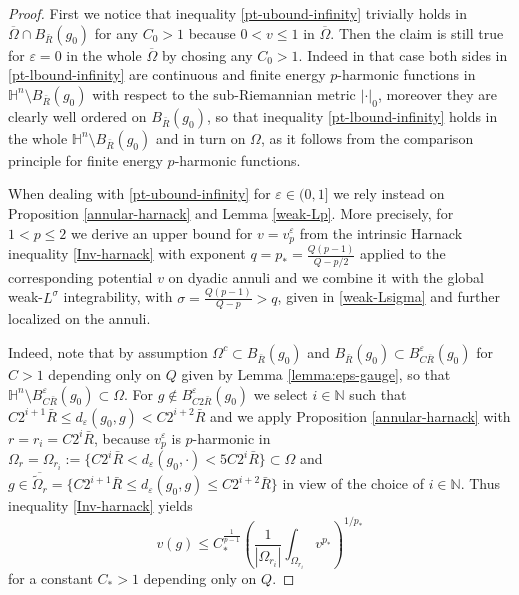 \documentclass[10pt]{amsart}
\numberwithin{equation}{section}
\theoremstyle{definition}
\newcommand{\He}{\mathbb{H}}
\begin{document}
\begin{proof} First we notice that inequality \eqref{pt-ubound-infinity} trivially holds in $\overline{\Omega} \cap B_{\bar{R}}(g_0)$ for any $C_0>1$ because $0<v \leq 1$ in $\overline{\Omega}$. Then the claim is still true for $\varepsilon=0$ in the whole $\overline{\Omega}$ by chosing any $C_0>1$. Indeed in that case both sides in \eqref{pt-lbound-infinity} are continuous and finite energy $p$-harmonic functions in $\He^n \setminus B_{\bar{R}}(g_0)$ with respect to the sub-Riemannian metric $|\cdot|_0$, moreover they are clearly well ordered on $B_{\bar{R}}(g_0)$, so that inequality \eqref{pt-lbound-infinity} holds in the whole $\He^n \setminus B_{\bar{R}}(g_0)$ and in turn on $\Omega$, as it follows from the comparison principle for finite energy $p$-harmonic functions. 

When dealing with \eqref{pt-ubound-infinity} for $\varepsilon \in (0,1]$ we rely instead on Proposition \ref{annular-harnack} and Lemma \ref{weak-Lp}.
More precisely, for $1<p \leq 2$ we derive an upper bound for $v=v^\varepsilon_p$ from the intrinsic Harnack inequality \eqref{Inv-harnack} with exponent $q=p_*=\frac{Q(p-1)}{Q-p/2}$ applied to the corresponding potential $v$ on dyadic annuli and we combine it with the global weak-$L^\sigma$ integrability, with $\sigma=\frac{Q(p-1)}{Q-p}>q$, given in \eqref{weak-Lsigma} and further localized on the annuli. 

 Indeed, note that by assumption $\Omega^c \subset B_{\bar{R}}(g_0)$ and $B_{\bar{R}}(g_0) \subset B^\varepsilon_{C\bar{R}}(g_0)$ for $C>1$ depending only on $Q$ given by Lemma \ref{lemma:eps-gauge}, so that $\He^n \setminus B^\varepsilon_{C\bar{R}}(g_0)\subset \Omega$.  For $g \not \in B^\varepsilon_{C2\bar{R}}(g_0) $ we select $ i \in \mathbb{N}$ such that $ C 2^{i+1} \bar{R} \leq d_\varepsilon(g_0,g)< C 2^{i+2} \bar{R}$ and we apply Proposition \ref{annular-harnack} with $r=r_i=C 2^i \bar{R}$, because $v^\varepsilon_p$ is $p$-harmonic in $\Omega_r=\Omega_{r_i}:= \{ C 2^i \bar{R} < d_\varepsilon(g_0,\cdot) <5 C 2^i \bar{R}\} \subset \Omega$ and $g \in \overline{\widetilde{\Omega}_r}=\{ C2^{i+1} \bar{R} \leq d_\varepsilon(g_0,g) \leq C2^{i+2} \bar{R} \}$ in view of the choice of $i \in \mathbb{N}$. 
Thus inequality \eqref{Inv-harnack} yields
\begin{equation}
\label{annuli-ub-1}
 v (g)\leq C_*^{\frac{1}{p-1}}  \left( \frac{1}{|\Omega_{r_i} |} \int_{\Omega_{r_i}}v^{p_*} \right)^{1/p_*} 
\end{equation}
for a constant $C_*>1$ depending only on $Q$. 


\end{proof}
\end{document}
